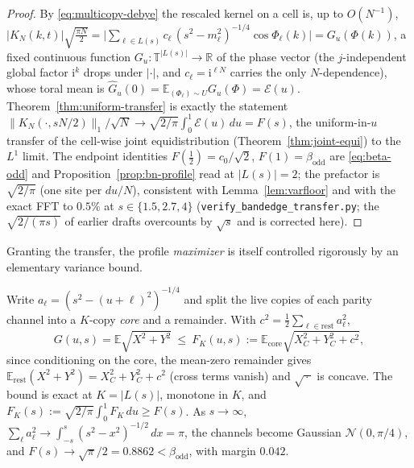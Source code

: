 \begin{proof}
By \eqref{eq:multicopy-debye} the rescaled kernel on a cell is, up to $O(N^{-1})$,
$|K_N(k,t)|\sqrt{\tfrac{\pi N}2}=\bigl|\sum_{\ell\in L(s)}c_\ell\,(s^2-m_\ell^2)^{-1/4}\cos\Phi_\ell(k)\bigr|
=G_u(\Phi(k))$, a fixed continuous function $G_u\colon\mathbb T^{|L(s)|}\to\mathbb R$ of the phase vector (the
$j$-independent global factor $\mathrm i^{k}$ drops under $|\cdot|$, and $c_\ell=\mathrm i^{\ell N}$ carries the
only $N$-dependence), whose toral mean is $\widehat G_u(0)=\mathbb E_{(\Phi_\ell)\sim U}G_u(\Phi)=\mathcal E(u)$.
Theorem~\ref{thm:uniform-transfer} is exactly the statement $\|K_N(\cdot,sN/2)\|_1/\sqrt N\to\sqrt{2/\pi}
\int_0^1\mathcal E(u)\,du=F(s)$, the uniform-in-$u$ transfer of the cell-wise joint equidistribution
(Theorem~\ref{thm:joint-equi}) to the $L^1$ limit. The endpoint identities $F(\tfrac12)=c_0/\sqrt2$,
$F(1)=\beta_{\mathrm{odd}}$ are \eqref{eq:beta-odd} and Proposition~\ref{prop:bn-profile} read at $|L(s)|=2$;
the prefactor is $\sqrt{2/\pi}$ (one site per $du/N$), consistent with Lemma~\ref{lem:varfloor} and with the
exact FFT to $0.5\%$ at $s\in\{1.5,2.7,4\}$ (\texttt{verify\_bandedge\_transfer.py}; the $\sqrt{2/(\pi s)}$ of
earlier drafts overcounts by $\sqrt s$ and is corrected here).
\end{proof}

Granting the transfer, the profile \emph{maximizer} is itself controlled rigorously by an elementary
variance bound.

\begin{lemma}[variance floor; the profile does not beat the $s=1$ peak]\label{lem:varfloor}
Write $a_\ell=(s^2-(u+\ell)^2)^{-1/4}$ and split the live copies of each parity channel into a $K$-copy
\emph{core} and a remainder. With $c^2=\tfrac12\sum_{\ell\in\mathrm{rest}}a_\ell^2$,
\[
  G(u,s)=\mathbb E\sqrt{X^2+Y^2}\ \le\ F_K(u,s):=\mathbb E_{\mathrm{core}}\sqrt{X_C^2+Y_C^2+c^2},
\]
since conditioning on the core, the mean-zero remainder gives $\mathbb E_{\mathrm{rest}}(X^2+Y^2)=
X_C^2+Y_C^2+c^2$ (cross terms vanish) and $\sqrt{\,\cdot\,}$ is concave. The bound is exact at $K=|L(s)|$,
monotone in $K$, and $F_K(s):=\sqrt{2/\pi}\int_0^1F_K\,du\ge F(s)$. As $s\to\infty$,
$\sum_\ell a_\ell^2\to\int_{-s}^s(s^2-x^2)^{-1/2}\,dx=\pi$, the channels become Gaussian $\mathcal N(0,\pi/4)$,
and $F(s)\to\sqrt\pi/2=0.8862<\beta_{\mathrm{odd}}$, with margin $0.042$.
\end{lemma}

